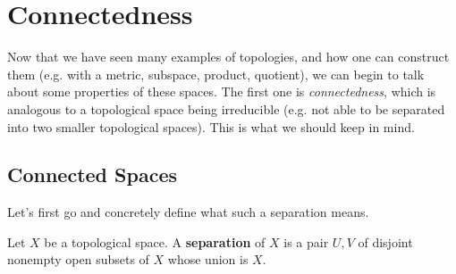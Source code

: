 \section{Connectedness} 

  Now that we have seen many examples of topologies, and how one can construct them (e.g. with a metric, subspace, product, quotient), we can begin to talk about some properties of these spaces. The first one is \textit{connectedness}, which is analogous to a topological space being irreducible (e.g. not able to be separated into two smaller topological spaces). This is what we should keep in mind. 

\subsection{Connected Spaces} 

  Let's first go and concretely define what such a separation means.

  \begin{definition}[Separation]
    Let $X$ be a topological space. A \textbf{separation} of $X$ is a pair $U, V$ of disjoint nonempty open subsets of $X$ whose union is $X$. 
  \end{definition}

